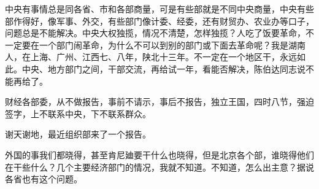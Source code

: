 中央有事情总是同各省、市和各部商量，可是有些部就是不同中央商量，中央有些部作得好，像军事、外交，有些部门像计委、经委，还有财贸办、农业办等口子，问题总是不能解决。中央大权独揽，情况不清楚，怎样独揽？人吃了饭要革命，不一定要在一个部门闹革命，为什么不可以到别的部门或下面去革命呢？我是湖南人，在上海、广州、江西七、八年，陕北十三年。不一定在一个地区干，永远如此。中央、地方部门之间，干部交流，再给试一年，看能否解决，陈伯达同志说不能再给了。

财经各部委，从不做报告，事前不请示，事后不报告，独立王国，四时八节，强迫签字，上不联系中央，下不联系群众。

谢天谢地，最近组织部来了一个报告。

外国的事我们都晓得，甚至肯尼廸要干什么也晓得，但是北京各个部，谁晓得他们在干些什么？几个主要经济部门的情况，我就不知道。不知道，怎么出主意？据说各省也有这个问题。


